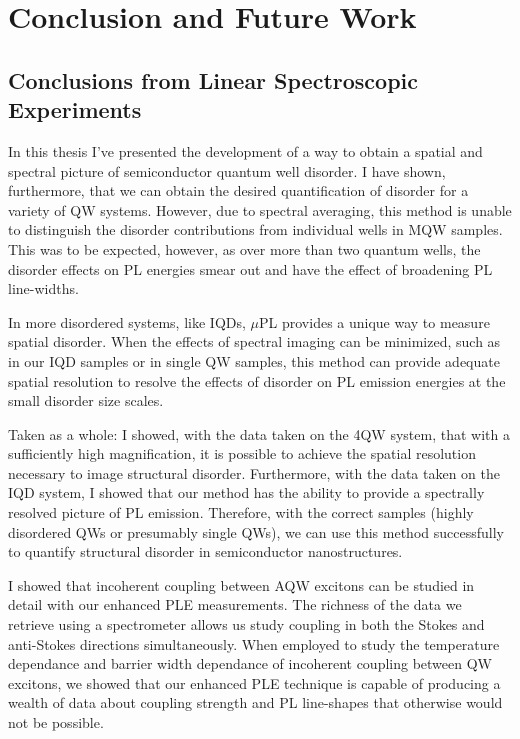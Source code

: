 \chapter{Conclusion and Future Work}
\section{Conclusions from Linear Spectroscopic Experiments}
\indent In this thesis I've presented the development of a way to obtain a spatial and spectral picture of semiconductor quantum well disorder. I have shown, furthermore, that we can obtain the desired quantification of disorder for a variety of QW systems. However, due to spectral averaging, this method is unable to distinguish the disorder contributions from individual wells in MQW samples. This was to be expected, however, as over more than two quantum wells, the disorder effects on PL energies smear out and have the effect of broadening PL line-widths.

\indent In more disordered systems, like IQDs, $\mu$PL provides a unique way to measure spatial disorder. When the effects of spectral imaging can be minimized, such as in our IQD samples or in single QW samples, this method can provide adequate spatial resolution to resolve the effects of disorder on PL emission energies at the small disorder size scales. 

\indent Taken as a whole: I showed, with the data taken on the 4QW system, that with a sufficiently high magnification, it is possible to achieve the spatial resolution necessary to image structural disorder. Furthermore, with the data taken on the IQD system, I showed that our method has the ability to provide a spectrally resolved picture of PL emission. Therefore, with the correct samples (highly disordered QWs or presumably single QWs), we can use this method successfully to quantify structural disorder in semiconductor nanostructures.

\indent I showed that incoherent coupling between AQW excitons can be studied in detail with our enhanced PLE measurements. The richness of the data we retrieve using a spectrometer allows us study coupling in both the Stokes and anti-Stokes directions simultaneously. When employed to study the temperature dependance and barrier width dependance of incoherent coupling between QW excitons, we showed that our enhanced PLE technique is capable of producing a wealth of data about coupling strength and PL line-shapes that otherwise would not be possible.

